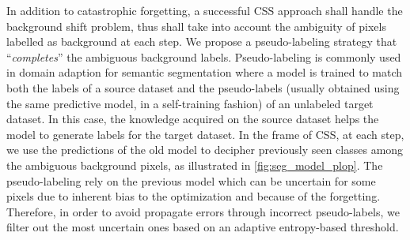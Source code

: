 In addition to catastrophic forgetting, a successful \ac{CSS} approach shall handle the background shift
problem, thus shall take into account the ambiguity of pixels labelled as background at each step.
We propose a pseudo-labeling strategy that ``\textit{completes}'' the ambiguous background labels.
Pseudo-labeling \cite{lee2013pseudolabel} is commonly used in domain adaption for semantic
segmentation
\cite{vu2019advent,li2019bidirectionallearning,zou2018classbalancedselftraining,saporta2020esl}
where a model is trained to match both the labels of a source dataset and the pseudo-labels (usually
obtained using the same predictive model, in a self-training fashion) of an unlabeled target
dataset. In this case, the knowledge acquired on the source dataset helps the model to generate
labels for the target dataset. In the frame of \ac{CSS}, at each step, we use the predictions of the old
model to decipher previously seen classes among the ambiguous background pixels, as illustrated in
\autoref{fig:seg_model_plop}. The pseudo-labeling rely on the previous model which can be uncertain
for some pixels due to inherent bias to the optimization and because of the forgetting. Therefore,
in order to avoid propagate errors through incorrect pseudo-labels, we filter out the most uncertain
ones based on an adaptive entropy-based threshold.

